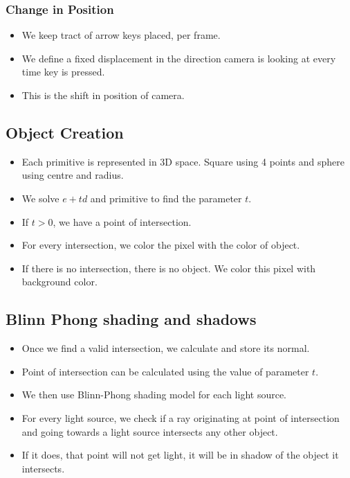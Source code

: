 \documentclass[a4paper]{article}
\begin{document}
\subsubsection{Change in Position}
\begin{itemize}
    \item We keep tract of arrow keys placed, per frame. 
    \item We define a fixed displacement in the direction camera is looking at every time key is pressed.
    \item This is the shift in position of camera. 
\end{itemize}
\subsection{Object Creation}
\begin{itemize}
    \item Each primitive is represented in 3D space. Square using 4 points and sphere using centre and radius.
    \item We solve $e+td$ and primitive to find the parameter $t$. 
    \item If $t > 0$, we have a point of intersection.
    \item For every intersection, we color the pixel with the color of object.
    \item If there is no intersection, there is no object. We color this pixel with background color.
\end{itemize}

\subsection{Blinn Phong shading and shadows}
\begin{itemize}
    \item Once we find a valid intersection, we calculate and store its normal.
    \item Point of intersection can be calculated using the value of parameter $t$.
    \item We then use Blinn-Phong shading model for each light source.
    \item For every light source, we check if a ray originating at point of intersection 
    and going towards a light source intersects any other object. 
    \item If it does, that point will not get light, it will be in shadow of the object it 
    intersects. 
\end{itemize}
\end{document}
